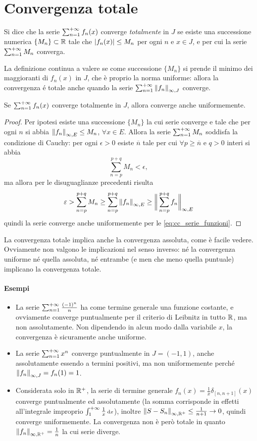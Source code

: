 \section{Convergenza totale}
\begin{definizione}
Si dice che la serie $\sum_{{n}=1}^{+\infty}f_n(x)$ converge \emph{totalmente} in $J$ se esiste una successione numerica $\{M_n\}\subset\mathbb{R}$ tale che $\left|{f_n(x)}\right|\leq M_n$ per ogni $n$ e $x\in J$, e per cui la serie $\sum_{{n}=1}^{+\infty}M_n$ converga.
\end{definizione}
La definizione continua a valere se come successione $\{M_n\}$ si prende il minimo dei maggioranti di $f_n(x)$ in $J$, che è proprio la norma uniforme: allora la convergenza é totale anche quando la serie $\sum_{{n}=1}^{+\infty}\left\|{f_n}\right\|_{\infty,J}$ converge.
\begin{teorema}[di Weierstra\ss]
Se $\sum_{{n}=1}^{+\infty}f_n(x)$ converge totalmente in $J$, allora converge anche uniformemente.
\end{teorema}
\begin{proof}
Per ipotesi esiste una successione $\{M_n\}$ la cui serie converge e tale che per ogni $n$ si abbia $\left\|{f_n}\right\|_{\infty,E}\leq M_n$, $\forall x\in E$. Allora la serie $\sum_{{n}=1}^{+\infty}M_n$ soddisfa la condizione di Cauchy: per ogni $\epsilon>0$ esiste $\overline{n}$ tale per cui $\forall p\geq\overline{n}$ e $q>0$ interi si abbia
\[
\sum_{n=p}^{p+q}M_n<\epsilon,
\]
ma allora per le disuguaglianze precedenti risulta
\[
\varepsilon>\sum_{n=p}^{p+q}M_n\geq\sum_{n=p}^{p+q}\left\|{f_n}\right\|_{\infty,E}\geq\bigg\|\sum_{n=p}^{p+q}f_n\bigg\|_{\infty,E}
\]
quindi la serie converge anche uniformemente per le \eqref{eq:cc_serie_funzioni}.
\end{proof}
La convergenza totale implica anche la convergenza assoluta, come è facile vedere. Ovviamente non valgono le implicazioni nel senso inverso: né la convergenza uniforme né quella assoluta, né entrambe (e men che meno quella puntuale) implicano la convergenza totale.
\paragraph{Esempi}
\begin{itemize}
\item La serie $\sum_{{n}=1}^{+\infty}\frac{(-1)^n}{n}$ ha come termine generale una funzione costante, e ovviamente converge puntualmente per il criterio di Leibnitz in tutto $\mathbb{R}$, ma non assolutamente. Non dipendendo in alcun modo dalla variabile $x$, la convergenza è sicuramente anche uniforme.
\item La serie $\sum_{{n}=1}^{+\infty}x^n$ converge puntualmente in $J=(-1,1)$, anche assolutamente essendo a termini positivi, ma non uniformemente perché $\left\|{f_n}\right\|_{\infty,J}=f_n(1)=1$.
\item Considerata solo in $\mathbb{R}^+$, la serie di termine generale $f_n(x)=\frac1{x}\delta_{[n,n+1]}\scriptstyle(x)$ converge puntualmente ed assolutamente (la somma corrisponde in effetti all'integrale improprio $\int_1^{+\infty}\frac1{x}\,\scriptstyle\textup{d} x$), inoltre $\left\|{S-S_n}\right\|_{\infty,\mathbb{R}^+}\leq\frac1{n+1}\to 0$, quindi converge uniformemente. La convergenza non è però totale in quanto $\left\|{f_n}\right\|_{\infty,\mathbb{R}^+}=\frac1{n}$ la cui serie diverge.
\end{itemize}

